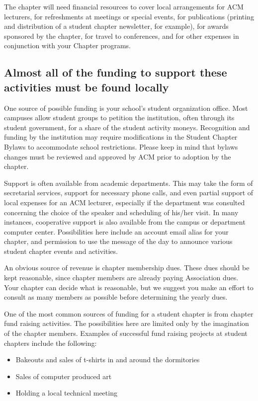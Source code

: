 The chapter will need financial resources to cover local arrangements for ACM lecturers, for refreshments at meetings or special events, for publications (printing and distribution of a student chapter newsletter, for example), for awards sponsored by the chapter, for travel to conferences, and for other expenses in conjunction with your Chapter programs.

\subsection{Almost all of the funding to support these activities must be found locally}
One source of possible funding is your school's student organization office. Most campuses allow student groups to petition the institution, often through its student government, for a share of the student activity moneys. Recognition and funding by the institution may require modifications in the Student Chapter Bylaws to accommodate school restrictions. Please keep in mind that bylaws changes must be reviewed and approved by ACM prior to adoption by the chapter.

Support is often available from academic departments. This may take the form of secretarial services, support for necessary phone calls, and even partial support of local expenses for an ACM lecturer, especially if the department was consulted concerning the choice of the speaker and scheduling of his/her visit. In many instances, cooperative support is also available from the campus or department computer center. Possibilities here include an account email alias for your chapter, and permission to use the message of the day to announce various student chapter events and activities.

An obvious source of revenue is chapter membership dues. These dues should be kept reasonable, since chapter members are already paying Association dues. Your chapter can decide what is reasonable, but we suggest you make an effort to consult as many members as possible before determining the yearly dues.

One of the most common sources of funding for a student chapter is from chapter fund raising activities. The possibilities here are limited only by the imagination of the chapter members. Examples of successful fund raising projects at student chapters include the following:
	\begin{itemize}
		\item Bakeouts and sales of t-shirts in and around the dormitories
		\item Sales of computer produced art
		\item Holding a local technical meeting
	\end{itemize}


